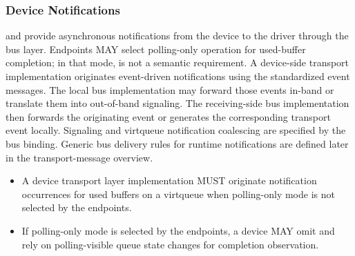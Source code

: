 \subsubsection{Device Notifications}
\label{sec:Virtio Transport Options / Virtio Over Messages / Device Operation / Device Notifications}

 and  provide asynchronous notifications
from the device to the driver through the bus layer. Endpoints MAY select
polling-only operation for used-buffer completion; in that mode,
 is not a semantic requirement. A device-side transport
implementation originates event-driven notifications using the standardized
event messages. The local bus implementation may forward those events in-band
or translate them into out-of-band signaling. The receiving-side bus
implementation then forwards the originating event or generates the
corresponding transport event locally. Signaling and virtqueue notification
coalescing are specified by the bus binding. Generic bus delivery rules for
runtime notifications are defined later in the transport-message overview.
\begin{itemize}
  \item A device transport layer implementation MUST originate
         notification occurrences for used buffers on a
        virtqueue when polling-only mode is not selected by the endpoints.
  \item If polling-only mode is selected by the endpoints, a device MAY omit
         and rely on polling-visible queue state changes for
        completion observation.
\end{itemize}


